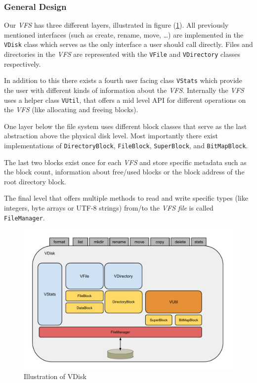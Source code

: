 \documentclass[a4paper,12pt]{article}
\begin{document}
\subsubsection{General Design}
Our \emph{VFS} has three different layers, illustrated in figure (\ref{abstactVdisk}).
All previously mentioned interfaces (such as create, rename, move, \dots) are implemented in the \texttt{VDisk} class which serves as the only interface a user should call directly. Files and directories in the \emph{VFS} are represented with the \texttt{VFile} and \texttt{VDirectory} classes respectively.

In addition to this there exists a fourth user facing class \texttt{VStats} which provide the user with different kinds of information about the \emph{VFS}.
Internally the \emph{VFS} uses a helper class \texttt{VUtil}, that offers a mid level API for different operations on the \emph{VFS} (like allocating and freeing blocks).

One layer below the file system uses different block classes that serve as the last abstraction above the physical disk level. Most importantly there exist implementations of \texttt{DirectoryBlock}, \texttt{FileBlock}, \texttt{SuperBlock}, and \texttt{BitMapBlock}.

The last two blocks exist once for each \emph{VFS} and store specific metadata such as the block count, information about free/used blocks or the block address of the root directory block.

The final level that offers multiple methods to read and write specific types (like integers, byte arrays or UTF-8 strings) from/to the \emph{VFS file} is called \texttt{FileManager}.

\begin{figure}[h]
\begin{center}
\includegraphics[scale=0.4]{images/AVDisk.pdf}
\caption{Illustration of VDisk}
\label{abstactVdisk}
\end{center}
\end{figure}
\end{document}
